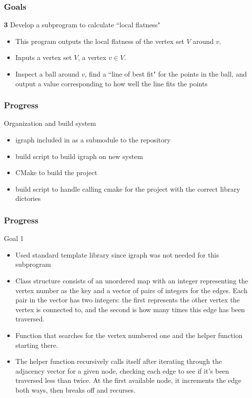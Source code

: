 \documentclass{beamer}
\begin{document}
\begin{frame}
    \frametitle{Goals}
    \textbf{3} Develop a subprogram to calculate ``local flatness"
    \begin{itemize}
        \item This program outputs the local flatness of the vertex set $V$ around $v$.
        \item Inputs a vertex set $V$, a vertex $v \in V$.
        \item Inspect a ball around $v$, find a ``line of best fit" for the points in the ball, and output a value corresponding to how well the line fits the points 
    \end{itemize}
\end{frame}

\begin{frame}
    \frametitle{Progress}

    Organization and build system
    \begin{itemize}
        \item igraph included in as a submodule to the repository
        \item build script to build igraph on new system
        \item CMake to build the project
        \item build script to handle calling cmake for the project with the correct library dictories
    \end{itemize}
\end{frame}

\begin{frame}
    \frametitle{Progress}

    Goal 1
    \begin{itemize}
        \item Used standard template library since igraph was not needed for this subprogram
        \item Class structure consists of an unordered map with an integer representing the vertex number as the key and a vector of pairs of integers for the edges. Each pair in the vector has two integers: the first represents the other vertex the vertex is connected to, and the second is how many times this edge has been traversed.
        \item Function that searches for the vertex numbered one and the helper function starting there.
        \item The helper function recursively calls itself after iterating through the adjacency vector for a given node, checking each edge to see if it's been traversed less than twice. At the first available node, it increments the edge both ways, then breaks off and recurses.
    \end{itemize}

\end{frame}
\end{document}
